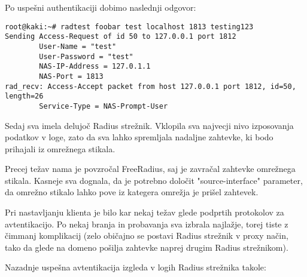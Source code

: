 \documentclass[12pt]{article}
\begin{document}
Po uspešni authentikaciji dobimo naslednji odgovor:

\begin{verbatim}
root@kaki:~# radtest foobar test localhost 1813 testing123
Sending Access-Request of id 50 to 127.0.0.1 port 1812
        User-Name = "test"
        User-Password = "test"
        NAS-IP-Address = 127.0.1.1
        NAS-Port = 1813
rad_recv: Access-Accept packet from host 127.0.0.1 port 1812, id=50, length=26
        Service-Type = NAS-Prompt-User
\end{verbatim}

Sedaj sva imela delujoč Radius strežnik. Vklopila sva najvecji nivo izposovanja podatkov v loge, zato da sva lahko spremljala nadaljne zahtevke, ki bodo prihajali iz omrežnega stikala.

Precej težav nama je povzročal FreeRadius, saj je zavračal zahtevke omrežnega stikala. Kasneje sva dognala, da je potrebno določit "source-interface" parameter, da omrežno stikalo lahko pove iz kategera omrežja je prišel zahtevek.

Pri nastavljanju klienta je bilo kar nekaj težav glede podprtih protokolov za avtentikacijo. Po nekaj branja in probavanja sva izbrala najlažje, torej tiste z čimmanj komplikacij (zelo običajno se postavi Radius strežnik v proxy način, tako da glede na domeno pošilja zahtevke naprej drugim Radius strežnikom).

Nazadnje uspešna avtentikacija izgleda v logih Radius strežnika takole:
\end{document}
